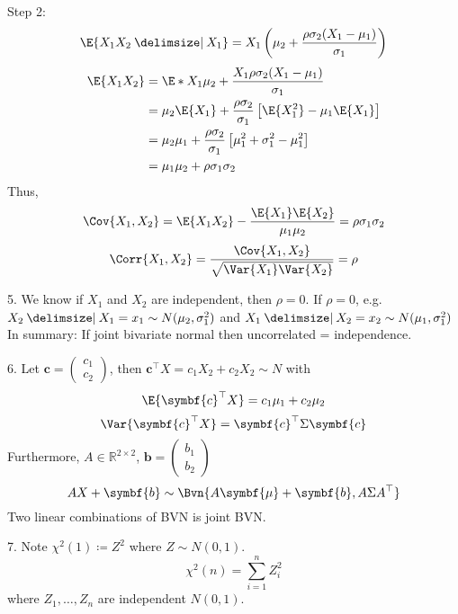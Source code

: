 Step 2:
\[ \E{X_1X_2\given X_1}=X_1
    \left(  \mu_2+\frac{\rho\sigma_2(X_1-\mu_1)}{\sigma_1} \right)
\]
\begin{align*}
    \E{X_1X_2}
     & = \E*{X_1\mu_2+\frac{X_1\rho\sigma_2(X_1-\mu_1)}{\sigma_1}}                         \\
     & =\mu_2\E{X_1}+\frac{\rho\sigma_2}{\sigma_1}
    \left[ \E{X_1^2}-\mu_1\E{X_1} \right]                                                  \\
     & =\mu_2\mu_1+\frac{\rho\sigma_2}{\sigma_1} \left[ \mu_1^2+\sigma_1^2-\mu_1^2 \right] \\
     & =\mu_1\mu_2+\rho\sigma_1\sigma_2
\end{align*}
Thus,
\[ \Cov{X_1,X_2}=\E{X_1X_2}-\frac{\E{X_1}\E{X_2}}{\mu_1\mu_2}=\rho\sigma_1\sigma_2  \]
\[ \Corr{X_1,X_2}=\frac{\Cov{X_1,X_2}}{\sqrt{\Var{X_1}\Var{X_2}}}=\rho  \]

5. We know if $ X_1 $ and $ X_2 $ are independent, then $ \rho=0 $.
If $ \rho=0 $, e.g. $ X_2\given X_1=x_1 \sim N(\mu_2,\sigma_1^2) $
and $ X_1\given X_2=x_2 \sim N(\mu_1,\sigma_1^2) $
In summary: If joint bivariate normal then uncorrelated = independence.

6. Let $ \symbf{c}=\begin{pmatrix}
        c_1 \\
        c_2
    \end{pmatrix} $, then
$ \symbf{c}^\top X=c_1X_2+c_2X_2 \sim N $ with
\[ \E{\symbf{c}^\top X}=c_1\mu_1+c_2\mu_2 \]
\[ \Var{\symbf{c}^\top X}=\symbf{c}^\top \Sigma\symbf{c} \]
Furthermore, $ A\in\mathbb{R}^{2\times 2} $,
$ \symbf{b}=\begin{pmatrix}
        b_1 \\
        b_2
    \end{pmatrix} $
\[ AX+\symbf{b} \sim \Bvn{A\symbf{\mu}+\symbf{b},A\Sigma A^\top} \]
Two linear combinations of BVN is joint BVN.\

7. Note $ \chi^2(1)\coloneq Z^2 $ where $ Z \sim N(0,1) $.
\[ \chi^2(n)=
    \sum_{i=1}^{n} Z_i^2 \]
where $ Z_1,\ldots,Z_n $ are independent $ N(0,1) $.
